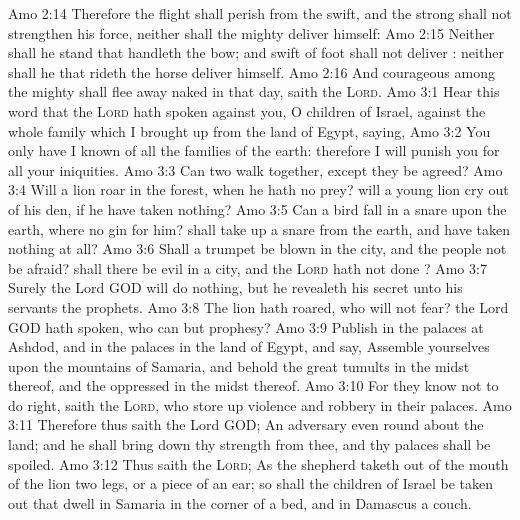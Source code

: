 \vs Amo 2:14 Therefore the flight shall perish from the swift, and the strong shall not strengthen his force, neither shall the mighty deliver himself:
\vs Amo 2:15 Neither shall he stand that handleth the bow; and  swift of foot shall not deliver : neither shall he that rideth the horse deliver himself.
\vs Amo 2:16 And  courageous among the mighty shall flee away naked in that day, saith the \textsc{Lord}.
\vs Amo 3:1 Hear this word that the \textsc{Lord} hath spoken against you, O children of Israel, against the whole family which I brought up from the land of Egypt, saying,
\vs Amo 3:2 You only have I known of all the families of the earth: therefore I will punish you for all your iniquities.
\vs Amo 3:3 Can two walk together, except they be agreed?
\vs Amo 3:4 Will a lion roar in the forest, when he hath no prey? will a young lion cry out of his den, if he have taken nothing?
\vs Amo 3:5 Can a bird fall in a snare upon the earth, where no gin  for him? shall  take up a snare from the earth, and have taken nothing at all?
\vs Amo 3:6 Shall a trumpet be blown in the city, and the people not be afraid? shall there be evil in a city, and the \textsc{Lord} hath not done ?
\vs Amo 3:7 Surely the Lord GOD will do nothing, but he revealeth his secret unto his servants the prophets.
\vs Amo 3:8 The lion hath roared, who will not fear? the Lord GOD hath spoken, who can but prophesy?
\vs Amo 3:9 Publish in the palaces at Ashdod, and in the palaces in the land of Egypt, and say, Assemble yourselves upon the mountains of Samaria, and behold the great tumults in the midst thereof, and the oppressed in the midst thereof.
\vs Amo 3:10 For they know not to do right, saith the \textsc{Lord}, who store up violence and robbery in their palaces.
\vs Amo 3:11 Therefore thus saith the Lord GOD; An adversary  even round about the land; and he shall bring down thy strength from thee, and thy palaces shall be spoiled.
\vs Amo 3:12 Thus saith the \textsc{Lord}; As the shepherd taketh out of the mouth of the lion two legs, or a piece of an ear; so shall the children of Israel be taken out that dwell in Samaria in the corner of a bed, and in Damascus  a couch.
